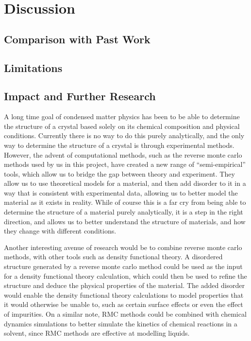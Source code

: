 \documentclass[a4paper,11pt]{article}
\begin{document}
\section{Discussion}
\subsection{Comparison with Past Work}
\subsection{Limitations}
\subsection{Impact and Further Research}
A long time goal of condensed matter physics has been to be able to determine the structure of a crystal based solely on its chemical composition and physical conditions. Currently there is no way to do this purely analytically, and the only way to determine the structure of a crystal is through experimental methods. However, the advent of computational methods, such as the reverse monte carlo methods used by us in this project, have created a new range of ``semi-empirical'' tools, which allow us to bridge the gap between theory and experiment. They allow us to use theoretical models for a material, and then add disorder to it in a way that is consistent with experimental data, allowing us to better model the material as it exists in reality. While of course this is a far cry from being able to determine the structure of a material purely analytically, it is a step in the right direction, and allows us to better understand the structure of materials, and how they change with different conditions.

Another interesting avenue of research would be to combine reverse monte carlo methods, with other tools such as density functional theory. A disordered structure generated by a reverse monte carlo method could be used as the input for a density functional theory calculation, which could then be used to refine the structure and deduce the physical properties of the material. The added disorder would enable the density functional theory calculations to model properties that it would otherwise be unable to, such as certain surface effects or even the effect of impurities. On a similar note, RMC methods could be combined with chemical dynamics simulations to better simulate the kinetics of chemical reactions in a solvent, since RMC methods are effective at modelling liquids.
\end{document}
